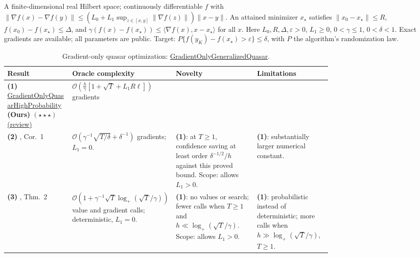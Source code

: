 \begin{table}[tp]
\centering
\caption{Gradient-only quasar optimization: \href{https://github.com/k3nfalt/longtails/blob/main/LongTails/Setups/GradientOnlyGeneralizedQuasar.lean}{GradientOnlyGeneralizedQuasar}.}\label{tab:GradientOnlyGeneralizedQuasar}
\parbox{\linewidth}{\footnotesize A finite-dimensional real Hilbert space; continuously differentiable $f$ with $\|\nabla f(x)-\nabla f(y)\|\le (L_0+L_1\sup_{z\in[x,y]}\|\nabla f(z)\|)\|x-y\|$. An attained minimizer $x_\star$ satisfies $\|x_0-x_\star\|\le R$, $f(x_0)-f(x_\star)\le\Delta$, and $\gamma(f(x)-f(x_\star))\le\langle\nabla f(x),x-x_\star\rangle$ for all $x$. Here $L_0,R,\Delta,\varepsilon>0$, $L_1\ge0$, $0<\gamma\le1$, $0<\delta<1$. Exact gradients are available; all parameters are public. Target: $P\{f(y_K)-f(x_\star)>\varepsilon\}\le\delta$, with $P$ the algorithm's randomization law.}\par\smallskip
\begin{threeparttable}
\footnotesize
\setlength{\tabcolsep}{4pt}\renewcommand{\arraystretch}{1.25}
\begin{tabularx}{\linewidth}{@{}>{\raggedright\arraybackslash}p{0.20\linewidth}>{\raggedright\arraybackslash}p{0.32\linewidth}>{\raggedright\arraybackslash}p{0.25\linewidth}>{\raggedright\arraybackslash}X@{}}
\toprule
\textbf{Result} & \textbf{Oracle complexity} & \textbf{Novelty} & \textbf{Limitations} \\
\midrule
\textbf{(1)} \href{https://github.com/k3nfalt/longtails/blob/main/LongTails/Theorems/GradientOnlyQuasarHighProbability.lean}{Gradient\allowbreak Only\allowbreak Quasar\allowbreak High\allowbreak Probability} \textbf{(Ours)} $(\star\star\star)$ \href{https://github.com/k3nfalt/longtails/blob/main/scripts/reviews/GradientOnlyQuasarHighProbability.md}{(review)} & $\mathcal{O}\!\left(\frac{h}{\gamma}[1+\sqrt T+L_1R\ell]\right)$ gradients & & \\
\midrule[1.2pt]
\textbf{(2)} \citep{goqWang2023v1}, Cor.~1 & $\mathcal{O}(\gamma^{-1}\sqrt{T/\delta}+\delta^{-1})$ gradients; $L_1=0$. & \textbf{(1)}: at $T\ge1$, confidence saving at least order $\delta^{-1/2}/h$ against this proved bound. Scope: allows $L_1>0$. & \textbf{(1)}: substantially larger numerical constant. \\
\midrule
\textbf{(3)} \citep{goqHinder2020}, Thm.~2 & $\mathcal{O}(1+\gamma^{-1}\sqrt T\log_+(\sqrt T/\gamma))$ value and gradient calls; deterministic, $L_1=0$. & \textbf{(1)}: no values or search; fewer calls when $T\ge1$ and $h\ll\log_+(\sqrt T/\gamma)$. Scope: allows $L_1>0$. & \textbf{(1)}: probabilistic instead of deterministic; more calls when $h\gg\log_+(\sqrt T/\gamma)$, $T\ge1$. \\

\end{tabularx}
\end{threeparttable}
\end{table}
